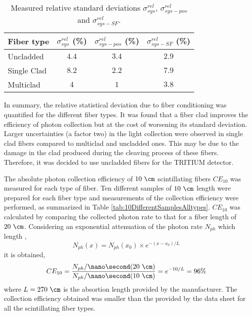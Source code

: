 \begin{table}[htbp]
\centering{}%
\begin{tabular}{lccc}
\toprule 
Fiber type & $\sigma^{rel}_{sys}$ (\%) & $\sigma^{rel}_{sys-pos}$ (\%) & $\sigma^{rel}_{sys-SF}$ (\%) \tabularnewline
\midrule
\midrule 
Uncladded & $4.4$ & $3.4$ & $2.9$ \tabularnewline
Single Clad & $8.2$ & $2.2$ & $7.9$ \tabularnewline
Multiclad & $4$ & $1$ & $3.8$ \tabularnewline
\bottomrule
\end{tabular}
\caption{Measured relative standard deviations $\sigma^{rel}_{sys}$, $\sigma^{rel}_{sys-pos}$ and $\sigma^{rel}_{sys-SF}$.}
\label{tab:RelativeStandardDeviations}
\end{table}

In summary, the relative statistical deviation due to fiber conditioning was quantified for the different fiber types. It was found that a fiber clad improves the efficiency of photon collection but at the cost of worsening its standard deviation. Larger uncertainties (a factor two) in the light collection were observed in single clad fibers compared to multiclad and uncladded ones. This may be due to the damage in the clad produced during the cleaving process of these fibers. Therefore, it was decided to use uncladded fibers for the TRITIUM detector. 

The absolute photon collection efficiency of $10~\cm$ scintillating fibers $CE_{10}$ was measured for each type of fiber. Ten different samples of $10~\cm$ length were prepared for each fiber type and measurements of the collection efficiency were performed, as summarized in Table \ref{tab:10DifferentSamplesAlltypes}. $CE_{10}$ was calculated by comparing the collected photon rate to that for a fiber length of $20~\cm$. Considering an exponential attenuation of the photon rate $N_{ph}$ which length \cite{Leo},
\begin{equation}
N_{ph}(x) = N_{ph}(x_0) \times e^{-(x-x_0)/L}
\label{eq:ExponentialAttenuation}
\end{equation}
it is obtained,
\begin{equation}
CE_{10}=\frac{N_{ph}/\nano\second(20~\cm)}{N_{ph}/\nano\second(10~\cm)}=e^{-10/L}=96\%
\label{eq:CollectionEfficiency}
\end{equation}
where $L=270~\cm$ is the absortion length provided by the manufacturer. The collection efficiency obtained was smaller than the provided by the data sheet for all the scintillating fiber types.

